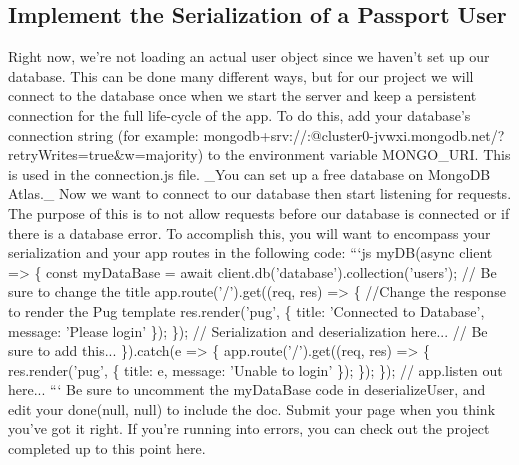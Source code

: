 \documentclass{article}%
\begin{document}
%
\subsection{Implement the Serialization of a Passport User}%
\label{subsec:ImplementtheSerializationofaPassportUser}%
Right now, we're not loading an actual user object since we haven't set up our database. This can be done many different ways, but for our project we will connect to the database once when we start the server and keep a persistent connection for the full life{-}cycle of the app.\newline%
To do this, add your database's connection string (for example: mongodb+srv://:@cluster0{-}jvwxi.mongodb.net/?retryWrites=true\&w=majority) to the environment variable MONGO\_URI. This is used in the connection.js file.\newline%
\_You can set up a free database on MongoDB Atlas.\_\newline%
Now we want to connect to our database then start listening for requests. The purpose of this is to not allow requests before our database is connected or if there is a database error. To accomplish this, you will want to encompass your serialization and your app routes in the following code:\newline%
```js\newline%
myDB(async client => \{\newline%
  const myDataBase = await client.db('database').collection('users');\newline%
  // Be sure to change the title\newline%
  app.route('/').get((req, res) => \{\newline%
    //Change the response to render the Pug template\newline%
    res.render('pug', \{\newline%
      title: 'Connected to Database',\newline%
      message: 'Please login'\newline%
    \});\newline%
  \});\newline%
  // Serialization and deserialization here...\newline%
  // Be sure to add this...\newline%
\}).catch(e => \{\newline%
  app.route('/').get((req, res) => \{\newline%
    res.render('pug', \{ title: e, message: 'Unable to login' \});\newline%
  \});\newline%
\});\newline%
// app.listen out here...\newline%
```\newline%
Be sure to uncomment the myDataBase code in deserializeUser, and edit your done(null, null) to include the doc.\newline%
Submit your page when you think you've got it right. If you're running into errors, you can check out the project completed up to this point here.\newline%
\end{document}
